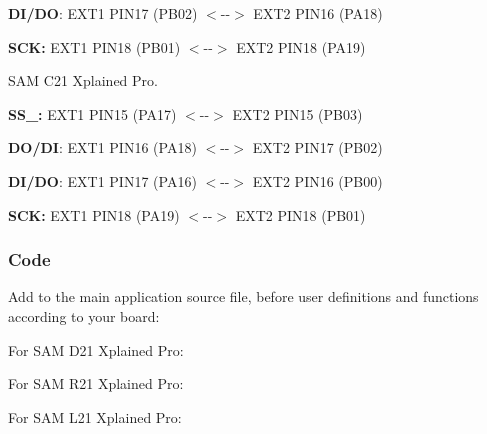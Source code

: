 \begin{DoxyItemize}
\begin{DoxyItemize}
\item {\bfseries{D\+I/\+DO}}\+: E\+X\+T1 P\+I\+N17 (P\+B02) $<$-\/-\/$>$ E\+X\+T2 P\+I\+N16 (P\+A18)
\item {\bfseries{S\+CK\+:}} E\+X\+T1 P\+I\+N18 (P\+B01) $<$-\/-\/$>$ E\+X\+T2 P\+I\+N18 (P\+A19)
\end{DoxyItemize}
\item S\+AM C21 Xplained Pro.
\begin{DoxyItemize}
\item {\bfseries{S\+S\+\_\+:}} E\+X\+T1 P\+I\+N15 (P\+A17) $<$-\/-\/$>$ E\+X\+T2 P\+I\+N15 (P\+B03)
\item {\bfseries{D\+O/\+DI}}\+: E\+X\+T1 P\+I\+N16 (P\+A18) $<$-\/-\/$>$ E\+X\+T2 P\+I\+N17 (P\+B02)
\item {\bfseries{D\+I/\+DO}}\+: E\+X\+T1 P\+I\+N17 (P\+A16) $<$-\/-\/$>$ E\+X\+T2 P\+I\+N16 (P\+B00)
\item {\bfseries{S\+CK\+:}} E\+X\+T1 P\+I\+N18 (P\+A19) $<$-\/-\/$>$ E\+X\+T2 P\+I\+N18 (P\+B01)
\end{DoxyItemize}
\end{DoxyItemize}\hypertarget{asfdoc_sam0_sercom_spi_dma_use_case_asfdoc_sam0_spi_dma_use_case_setup_code}{}\subsubsection{Code}\label{asfdoc_sam0_sercom_spi_dma_use_case_asfdoc_sam0_spi_dma_use_case_setup_code}
Add to the main application source file, before user definitions and functions according to your board\+:

For S\+AM D21 Xplained Pro\+: 
\begin{DoxyCodeInclude}{0}
\end{DoxyCodeInclude}

\begin{DoxyCodeInclude}{0}
\end{DoxyCodeInclude}

\begin{DoxyCodeInclude}{0}
\end{DoxyCodeInclude}
For S\+AM R21 Xplained Pro\+: 
\begin{DoxyCodeInclude}{0}
\end{DoxyCodeInclude}

\begin{DoxyCodeInclude}{0}
\end{DoxyCodeInclude}

\begin{DoxyCodeInclude}{0}
\end{DoxyCodeInclude}
For S\+AM L21 Xplained Pro\+: 
\begin{DoxyCodeInclude}{0}
\end{DoxyCodeInclude}


